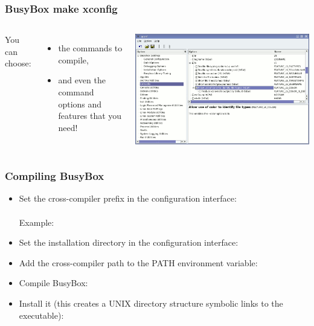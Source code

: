 \begin{frame}
  \frametitle{BusyBox make xconfig}
  \begin{columns}
    You can choose:
    \begin{itemize}
    \item the commands to compile,
    \item and even the command options and features that you need!
    \end{itemize}
    \includegraphics[width=\textwidth]{slides/sysdev-busybox/xconfig-screenshot.png}
  \end{columns}
\end{frame}

\begin{frame}
  \frametitle{Compiling BusyBox}
  \begin{itemize}
  \item Set the cross-compiler prefix in the configuration interface: \\
    \\
    Example: 
  \item Set the installation directory in the configuration interface: \\
  \item Add the cross-compiler path to the PATH environment variable:\\
  \item Compile BusyBox:\\
  \item Install it (this creates a UNIX directory structure symbolic
    links to the  executable):\\
  \end{itemize}
\end{frame}

